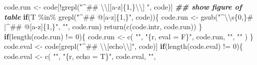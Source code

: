 \documentclass[
]{article}
\newenvironment{Shaded}{\begin{snugshade}}{\end{snugshade}}
\newcommand{\ControlFlowTok}[1]{\textcolor[rgb]{0.13,0.29,0.53}{\textbf{#1}}}
\newcommand{\DecValTok}[1]{\textcolor[rgb]{0.00,0.00,0.81}{#1}}
\newcommand{\DocumentationTok}[1]{\textcolor[rgb]{0.56,0.35,0.01}{\textbf{\textit{#1}}}}
\newcommand{\FunctionTok}[1]{\textcolor[rgb]{0.00,0.00,0.00}{#1}}
\newcommand{\NormalTok}[1]{#1}
\newcommand{\OtherTok}[1]{\textcolor[rgb]{0.56,0.35,0.01}{#1}}
\newcommand{\SpecialCharTok}[1]{\textcolor[rgb]{0.00,0.00,0.00}{#1}}
\newcommand{\StringTok}[1]{\textcolor[rgb]{0.31,0.60,0.02}{#1}}
\begin{document}
\begin{Shaded}
\begin{Highlighting}[]
\NormalTok{                            code.run }\OtherTok{\textless{}{-}}\NormalTok{ code[}\SpecialCharTok{!}\FunctionTok{grepl}\NormalTok{(}\StringTok{"\^{}\#\# }\SpecialCharTok{\textbackslash{}\textbackslash{}}\StringTok{[[a{-}z]\{1,\}}\SpecialCharTok{\textbackslash{}\textbackslash{}}\StringTok{] "}\NormalTok{, code)]}
                            \DocumentationTok{\#\# show figure of table}
                            \ControlFlowTok{if}\NormalTok{(T }\SpecialCharTok{\%in\%} \FunctionTok{grepl}\NormalTok{(}\StringTok{"\^{}\#\# @[a{-}z]\{1,\}"}\NormalTok{, code))\{}
\NormalTok{                              code.run }\OtherTok{\textless{}{-}} \FunctionTok{gsub}\NormalTok{(}\StringTok{"\^{}}\SpecialCharTok{\textbackslash{}\textbackslash{}}\StringTok{s\{0,\}\# |\^{}\#\# @[a{-}z]\{1,\}"}\NormalTok{, }\StringTok{""}\NormalTok{, code.run)}
                              \FunctionTok{return}\NormalTok{(}\FunctionTok{c}\NormalTok{(code.intr, code.run))}
\NormalTok{                            \}}
                            \ControlFlowTok{if}\NormalTok{(}\FunctionTok{length}\NormalTok{(code.run) }\SpecialCharTok{!=} \DecValTok{0}\NormalTok{)\{}
\NormalTok{                              code.run }\OtherTok{\textless{}{-}} \FunctionTok{c}\NormalTok{(}
                                \StringTok{""}\NormalTok{,}
                                \StringTok{"\textasciigrave{}\textasciigrave{}\textasciigrave{}\{r, eval = F\}"}\NormalTok{,}
\NormalTok{                                code.run,}
                                \StringTok{"\textasciigrave{}\textasciigrave{}\textasciigrave{}"}\NormalTok{,}
                                \StringTok{""}
\NormalTok{                              )}
\NormalTok{                            \}}
\NormalTok{                            code.eval }\OtherTok{\textless{}{-}}\NormalTok{ code[}\FunctionTok{grepl}\NormalTok{(}\StringTok{"\^{}\#\# }\SpecialCharTok{\textbackslash{}\textbackslash{}}\StringTok{[echo}\SpecialCharTok{\textbackslash{}\textbackslash{}}\StringTok{]"}\NormalTok{, code)]}
                            \ControlFlowTok{if}\NormalTok{(}\FunctionTok{length}\NormalTok{(code.eval) }\SpecialCharTok{!=} \DecValTok{0}\NormalTok{)\{}
\NormalTok{                              code.eval }\OtherTok{\textless{}{-}} \FunctionTok{c}\NormalTok{(}
                                \StringTok{""}\NormalTok{,}
                                \StringTok{"\textasciigrave{}\textasciigrave{}\textasciigrave{}\{r, echo = T\}"}\NormalTok{,}
\NormalTok{                                code.eval,}
                                \StringTok{"\textasciigrave{}\textasciigrave{}\textasciigrave{}"}\NormalTok{,}

\end{Highlighting}
\end{Shaded}
\end{document}
